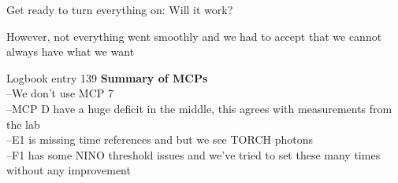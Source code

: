 \documentclass[xcolor = table]{beamer}
\begin{document}
\begin{frame}{Get ready to turn everything on: Will it work?}
  \begin{center}
    However, not everything went smoothly and we had to accept that we cannot always have what we want
  \end{center}
  \begin{block}{Logbook entry 139}
    \textbf{Summary of MCPs}\\
    --We don't use MCP 7\\
    --MCP D have a huge deficit in the middle, this agrees with measurements from the lab\\
    --E1 is missing time references and but we see TORCH photons\\
    --F1 has some NINO threshold issues and we've tried to set these many times without any improvement
  \end{block}
\end{frame}
\end{document}
